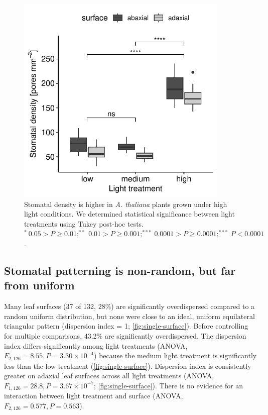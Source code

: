 \documentclass[webpdf,large,modern,unnumsec,namedate]{oup-authoring-template}
\begin{document}
\begin{figure}[ht]
\includegraphics[width = 4in]{figures/density.pdf}
\caption{Stomatal density is higher in \textit{A. thaliana} plants grown under high light conditions. We determined statistical significance between light treatments using Tukey post-hoc tests. $^*~0.05 > P \ge 0.01; ^{**}~0.01 > P \ge 0.001; ^{***}~0.0001 > P \ge 0.0001; ^{***}~ P <0.0001$.}
\label{fig:density}
\end{figure}

\subsection{Stomatal patterning is non-random, but far from
uniform}\label{stomatal-patterning-is-non-random-but-far-from-uniform}

Many leaf surfaces (37 of 132, 28\%) are significantly overdispersed
compared to a random uniform distribution, but none were close to an
ideal, uniform equilateral triangular pattern (dispersion index = 1;
\autoref{fig:single-surface}). Before controlling for multiple
comparisons, 43.2\% are significantly overdispersed. The dispersion
index differs significantly among light treatments (ANOVA,
\(F_{2,126} = 8.55, P = 3.30 \times 10^{-4}\)) because the medium light
treatment is significantly less than the low treatment
(\autoref{fig:single-surface}). Dispersion index is consistently greater
on adaxial leaf surfaces across all light treatments (ANOVA,
\(F_{1,126} = 28.8, P = 3.67 \times 10^{-7}\);
\autoref{fig:single-surface}). There is no evidence for an interaction
between light treatment and surface (ANOVA,
\(F_{2,126} = 0.577, P = 0.563\)).
\end{document}
